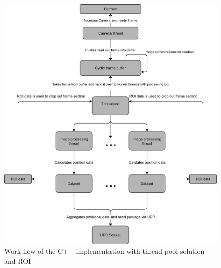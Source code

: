 \begin{figure}[H]
\includegraphics[width=\textwidth]{images/pi_workflow_500.jpg}
\caption{Work flow of the C++ implementation with thread pool solution and ROI}
\label{c++ work flow map} 
\end{figure}
